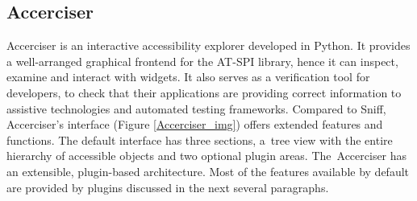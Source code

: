 \subsection{Accerciser}
Accerciser is an interactive accessibility explorer developed in Python. It provides a well-arranged graphical frontend for the AT-SPI library, hence it can inspect, examine and interact with widgets. It also serves as a verification tool for developers, to check that their applications are providing correct information to assistive technologies and automated testing frameworks. Compared to Sniff, Accerciser's interface (Figure \ref{Accerciser_img}) offers extended features and functions. The default interface has three sections, a~tree view with the entire hierarchy of accessible objects and two optional plugin areas. The~Accerciser has an extensible, plugin-based architecture. Most of the features available by default are provided by plugins discussed in the next several paragraphs.

